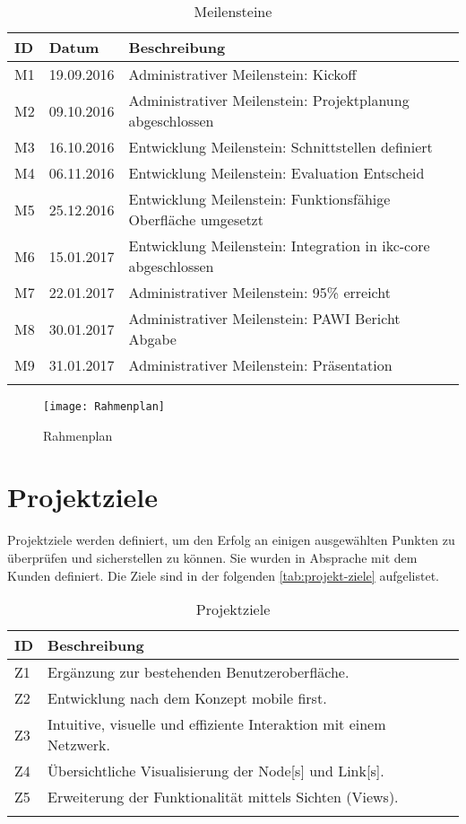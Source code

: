 \begin{longtable}{|p{1cm}|p{2cm}|p{8.5cm}|}
  \hline
    ID & Datum &  Beschreibung \\\hline
    M1 & 19.09.2016 & Administrativer Meilenstein: Kickoff\\\hline
    M2 & 09.10.2016 & Administrativer Meilenstein: Projektplanung abgeschlossen\\\hline
    M3 & 16.10.2016 & Entwicklung Meilenstein: Schnittstellen definiert\\\hline
    M4 & 06.11.2016 & Entwicklung Meilenstein: Evaluation Entscheid\\\hline
    M5 & 25.12.2016 & Entwicklung Meilenstein: Funktionsfähige Oberfläche umgesetzt\\\hline
    M6 & 15.01.2017 & Entwicklung Meilenstein: Integration in \gls{ikc-core} abgeschlossen\\\hline
    M7 & 22.01.2017 & Administrativer Meilenstein: 95\% erreicht\\\hline
    M8 & 30.01.2017 & Administrativer Meilenstein: PAWI Bericht Abgabe\\\hline
    M9 & 31.01.2017 & Administrativer Meilenstein: Präsentation\\\hline
    \caption{Meilensteine}
  \label{tab:meilensteine}
\end{longtable}

\newpage

\begin{landscape}
\begin{figure}[ht]
\centering
\texttt{[image: Rahmenplan]}
\caption{Rahmenplan}
\label{fig:rahmenplan}
\end{figure}
\end{landscape}

\newpage

\section{Projektziele} \label{projektziele}
Projektziele werden definiert, um den Erfolg an einigen ausgewählten Punkten zu überprüfen und sicherstellen zu können. Sie wurden in Absprache mit dem Kunden definiert. Die Ziele sind in der folgenden \autoref{tab:projekt-ziele} aufgelistet.

\begin{longtable}{|p{1cm}  | p{10.5cm}|}
  \hline
    ID &  Beschreibung \\\hline
    Z1 & Ergänzung zur bestehenden Benutzeroberfläche.\\\hline
    Z2 & Entwicklung nach dem Konzept \gls{mobile first}.\\\hline
    Z3 & Intuitive, visuelle und effiziente Interaktion mit einem \gls{Netzwerk}.\\\hline
    Z4 & Übersichtliche Visualisierung der \gls{Node}[s] und \gls{Link}[s].\\\hline
    Z5 & Erweiterung der Funktionalität mittels Sichten (\gls{View}s).\\\hline
    \caption{Projektziele}
  \label{tab:projekt-ziele}
\end{longtable}

